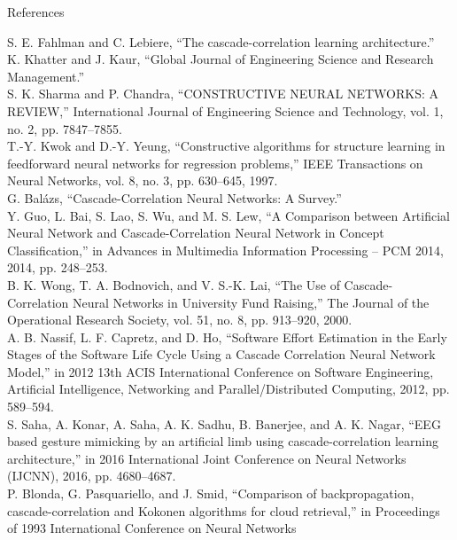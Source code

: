 \documentclass[presentation]{beamer}
\begin{document}
\begin{frame}[allowframebreaks, t]{References}
  \tiny
  \begin{thebibliography}{99}
    \bibitem[]{} S. E. Fahlman and C. Lebiere, “The cascade-correlation learning 
    architecture.” \\
    \bibitem{} K. Khatter and J. Kaur, “Global Journal of Engineering Science and
    Research Management.” \\
    \bibitem{} S. K. Sharma and P. Chandra, “CONSTRUCTIVE NEURAL NETWORKS: A REVIEW,”
    International Journal of Engineering Science and Technology, vol. 1, no. 2,
    pp. 7847–7855. \\
    \bibitem{} T.-Y. Kwok and D.-Y. Yeung, “Constructive algorithms for structure
    learning in feedforward neural networks for regression problems,” IEEE
    Transactions on Neural Networks, vol. 8, no. 3, pp. 630–645, 1997. \\
    \bibitem{} G. Balázs, “Cascade-Correlation Neural Networks: A Survey.” \\
    \bibitem{} Y. Guo, L. Bai, S. Lao, S. Wu, and M. S. Lew, “A Comparison between
    Artificial Neural Network and Cascade-Correlation Neural Network in Concept
    Classification,” in Advances in Multimedia Information Processing – PCM
    2014, 2014, pp. 248–253. \\ 
    \bibitem{} B. K. Wong, T. A. Bodnovich, and V. S.-K. Lai, “The Use of
    Cascade-Correlation Neural Networks in University Fund Raising,” The Journal
    of the Operational Research Society, vol. 51, no. 8, pp. 913–920, 2000. \\
    \bibitem{} A. B. Nassif, L. F. Capretz, and D. Ho, “Software Effort Estimation in
    the Early Stages of the Software Life Cycle Using a Cascade Correlation
    Neural Network Model,” in 2012 13th ACIS International Conference on
    Software Engineering, Artificial Intelligence, Networking and
    Parallel/Distributed Computing, 2012, pp. 589–594. \\
    \bibitem{} S. Saha, A. Konar, A. Saha, A. K. Sadhu, B. Banerjee, and A. K. Nagar,
    “EEG based gesture mimicking by an artificial limb using cascade-correlation
    learning architecture,” in 2016 International Joint Conference on Neural
    Networks (IJCNN), 2016, pp. 4680–4687. \\
    \bibitem{} P. Blonda, G. Pasquariello, and J. Smid, “Comparison of backpropagation,
    cascade-correlation and Kokonen algorithms for cloud retrieval,” in
    Proceedings of 1993 International Conference on Neural Networks

\end{thebibliography}
\end{frame}
\end{document}
